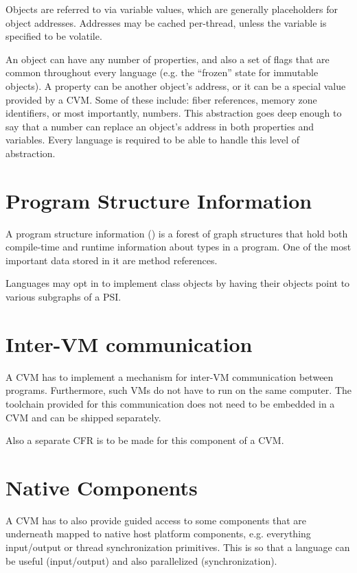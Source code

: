 Objects are referred to via variable values, which are generally placeholders for object addresses. Addresses may be cached per-thread, unless the variable is specified to be volatile. 

An object can have any number of properties, and also a set of flags that are common throughout every language (e.g. the ``frozen'' state for immutable objects). A property can be another object's address, or it can be a special value provided by a CVM. Some of these include: fiber references, memory zone identifiers, or most importantly, numbers. This abstraction goes deep enough to say that a number can replace an object's address in both properties and variables. Every language is required to be able to handle this level of abstraction. 






\section{Program Structure Information}
\label{sec:psi}

A program structure information () is a forest of graph structures that hold both compile-time and runtime information about types in a program. One of the most important data stored in it are method references. 

Languages may opt in to implement class objects by having their objects point to various subgraphs of a PSI. 





\section{Inter-VM communication} %

A CVM has to implement a mechanism for inter-VM communication between programs. Furthermore, such VMs do not have to run on the same computer. The toolchain provided for this communication does not need to be embedded in a CVM and can be shipped separately. 

Also a separate CFR is to be made for this component of a CVM. 





\section{Native Components} %

A CVM has to also provide guided access to some components that are underneath mapped to native host platform components, e.g. everything input/output or thread synchronization primitives. This is so that a language can be useful (input/output) and also parallelized (synchronization). 





